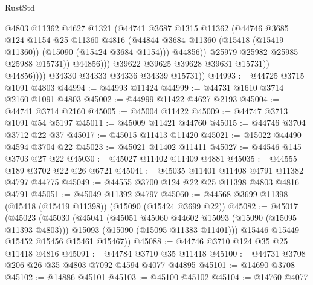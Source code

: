 \begin{lexlean}{RustStd}
\begin{coremodule}
                              @4803
                              @11362
                              @4627
                              @1321
                              (@44741
                                @3687
                                @1315
                                @11362
                                (@44746
                                  @3685
                                  @124
                                  @1154
                                  @25
                                  @11360
                                  @4816
                                  (@44844
                                    @3684
                                    @11360
                                    (@15418 (@15419 @11360))
                                    (@15090 (@15424 @3684 @1154)))
                                  @44856))
                              @25979
                              @25982
                              @25985
                              @25988
                              @15731))
                          @44856)))
                    @39622
                    @39625
                    @39628
                    @39631
                    @15731))
                @44856))))
        @34330
        @34333
        @34336
        @34339
        @15731))
@44993 := @44725 @3715 @1091 @4803
@44994 := @44993 @11424
@44999 := @44731 @1610 @3714 @2160 @1091 @4803
@45002 := @44999 @11422 @4627 @2193
@45004 := @44741 @3714 @2160
@45005 := @45004 @11422
@45009 := @44747 @3713 @1091 @54 @5197
@45011 := @45009 @11421 @44760
@45015 := @44746 @3704 @3712 @22 @37
@45017 := @45015 @11413 @11420
@45021 := @15022 @44490 @4594 @3704 @22
@45023 := @45021 @11402 @11411
@45027 := @44546 @145 @3703 @27 @22
@45030 := @45027 @11402 @11409 @4881
@45035 := @44555 @189 @3702 @22 @26 @6721
@45041 := @45035 @11401 @11408 @4791 @11382 @4797 @44775
@45049 := @44555 @3700 @124 @22 @25 @11398 @4803 @4816 @4791
@45051 := @45049 @11392 @4797
@45060 := @44568 @3699 @11398 (@15418 (@15419 @11398)) (@15090 (@15424 @3699 @22))
@45082 := @45017
    (@45023
      (@45030
        (@45041
          (@45051 @45060 @44602 @15093 (@15090 (@15095 @11393 @4803)))
          @15093
          (@15090 (@15095 @11383 @11401)))
        @15446
        @15449
        @15452
        @15456
        @15461
        @15467))
@45088 := @44746 @3710 @124 @35 @25 @11418 @4816
@45091 := @44784 @3710 @35 @11418
@45100 := @44731 @3708 @206 @26 @35 @4803 @7092 @4594 @4077 @44895
@45101 := @14690 @3708
@45102 := @14886 @45101
@45103 := @45100 @45102
@45104 := @14760 @4077

\end{coremodule}
\end{lexlean}
